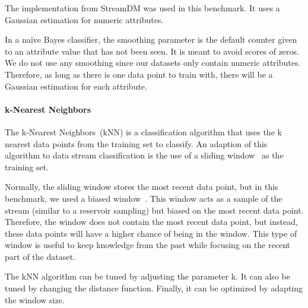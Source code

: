 The implementation from StreamDM was used in this
benchmark. It uses a Gaussian
estimation for numeric attributes.

In a naïve Bayes classifier, the smoothing parameter is the
default counter given to an attribute value that
has not been seen. It is meant to avoid scores of zeros.
We do not use any smoothing since our datasets
only contain numeric
attributes. Therefore, as long as there is one data
point to train with, there will be a Gaussian
estimation for each attribute.

\paragraph{k-Nearest Neighbors}

The k-Nearest Neighbors~(kNN) is a classification
algorithm that uses the k nearest data points from
the training set to classify.  An adaption of this
algorithm to data stream classification is the use
of a sliding window~\cite{Mining_Massive_Datasets}
as the training set.

Normally, the sliding window stores the most
recent data point, but in this benchmark, we used
a biased window~\cite{biased_reservoir_sampling}.
This window acts as a sample of
the stream (similar to a reservoir sampling) but
biased on the most recent data point.  Therefore,
the window does not contain the most recent data
point, but instead, these data points will have a
higher chance of being in the window.  This type
of window is useful to keep knowledge from the
past while focusing on the recent part of the
dataset.

The kNN algorithm can be tuned by adjusting the
parameter k. It can also be tuned by changing the
distance function. Finally, it can be optimized by
adapting the window size.

